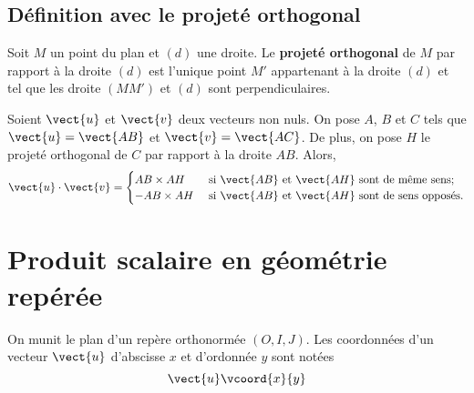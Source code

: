 \documentclass{article}
\begin{document}
\subsection{Définition avec le projeté orthogonal}
\begin{tcolorbox}
    
\begin{definition}[Rappel]
Soit $M$ un point du plan et $(d)$ une droite. Le \textbf{projeté orthogonal} de $M$ par rapport à la droite $(d)$ est l'unique point $M'$ appartenant à la droite $(d)$ et tel que les droite $(MM')$ et $(d)$ sont perpendiculaires.
\end{definition}
\end{tcolorbox}
\begin{proposition}
Soient $\vect{u}$ et $\vect{v}$ deux vecteurs non nuls. On pose $A$, $B$ et $C$ tels que $\vect{u} = \vect{AB}$ et $\vect{v} = \vect{AC}$. De plus, on pose $H$ le projeté orthogonal de $C$ par rapport à la droite $AB$. Alors,
\begin{equation*}
\vect{u} \cdot \vect{v} = 
\begin{cases}
AB \times AH & \text{ si $\vect{AB}$ et $\vect{AH}$ sont de même sens;}\\
- AB \times AH& \text{ si $\vect{AB}$ et $\vect{AH}$ sont de sens opposés.}
\end{cases}
\end{equation*}
\end{proposition}
\emptybox{3cm}

\newpage
\section{Produit scalaire en géométrie repérée}
On munit le plan d'un repère orthonormée $(O,I,J)$. Les coordonnées d'un vecteur $\vect{u}$ d'abscisse $x$ et d'ordonnée $y$ sont notées
\begin{equation*}
\vect{u}\vcoord{x}{y}
\end{equation*}
\end{document}
